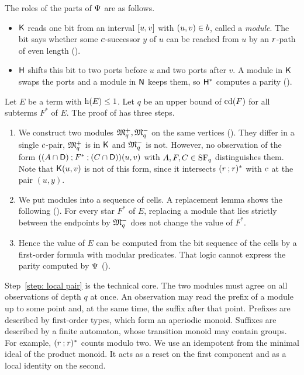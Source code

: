The roles of the parts of $\Psi$ are as follows.
\begin{itemize}
  \item $\mathsf{K}$ reads one bit from an interval $[u, v]$ with $(u, v) \in b$, called a \emph{module}.
        The bit says whether some $c$-successor $y$ of $u$ can be reached from $u$ by an $r$-path of even length ().
  \item $\mathsf{H}$ shifts this bit to two ports before $u$ and two ports after $v$.
        A module in $\mathsf{K}$ swaps the ports and a module in $\mathsf{N}$ keeps them, so $\mathsf{H}^{*}$ computes a parity ().
\end{itemize}
Let $E$ be a term with $\mathrm{h}(E) \le 1$.
Let $q$ be an upper bound of $\mathrm{cd}(F)$ for all subterms $F^{*}$ of $E$.
The proof of  has three steps.
\begin{enumerate}
  \item\label{step: local pair}
        We construct two modules $\mathfrak{M}^{+}_{q}, \mathfrak{M}^{-}_{q}$ on the same vertices ().
        They differ in a single $c$-pair, $\mathfrak{M}^{+}_q$ is in $\mathsf{K}$ and $\mathfrak{M}^{-}_q$ is not.
        However, no observation of the form $((A \cap \mathsf{D}) \mathbin{;} F^{*} \mathbin{;} (C \cap \mathsf{D}))(u, v)$ with $A, F, C \in \mathrm{SF}_{q}$ distinguishes them.
        Note that $\mathsf{K}(u, v)$ is not of this form, since it intersects $(r \mathbin{;} r)^{*}$ with $c$ at the pair $(u, y)$.
  \item\label{step: replacement}
        We put modules into a sequence of cells.
        A replacement lemma shows the following ().
        For every star $F^{*}$ of $E$, replacing a module that lies strictly between the endpoints by $\mathfrak{M}^{-}_{q}$ does not change the value of $F^{*}$.
  \item\label{step: logic}
        Hence the value of $E$ can be computed from the bit sequence of the cells by a first-order formula with modular predicates.
        That logic cannot express the parity computed by $\Psi$ ().
\end{enumerate}
Step~\ref{step: local pair} is the technical core.
The two modules must agree on all observations of depth $q$ at once.
An observation may read the prefix of a module up to some point and, at the same time, the suffix after that point.
Prefixes are described by first-order types, which form an aperiodic monoid.
Suffixes are described by a finite automaton, whose transition monoid may contain groups.
For example, $(r \mathbin{;} r)^{*}$ counts modulo two.
We use an idempotent from the minimal ideal of the product monoid.
It acts as a reset on the first component and as a local identity on the second.
